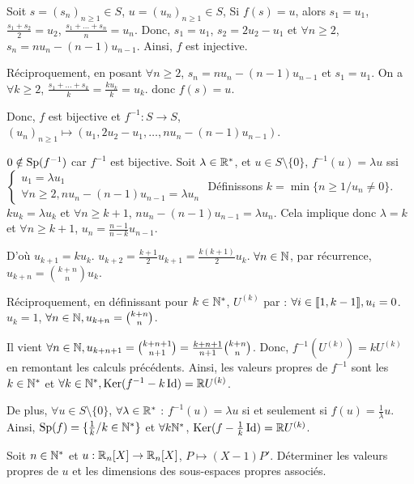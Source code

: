 \begin{solution}
Soit $s = (s_n)_{n \geq 1} \in S$, $u = (u_n)_{n \geq 1} \in S$,
Si $f(s) = u$, alors $s_1 = u_1$, $\frac{s_1+s_2}{2} = u_2$, $\frac{s_1+\dots+s_n}{n} = u_n$.
Donc, $s_1 = u_1$, $s_2 = 2u_2 - u_1$ et $\forall n \geq 2$, $s_n = n u_n - (n-1) u_{n-1}$.
Ainsi, $f$ est injective.

Réciproquement, en posant $\forall n \geq 2$, $s_n = n u_n - (n-1) u_{n-1}$ et $s_1 = u_1$.
On a $\forall k \geq 2$, $\frac{s_1 + \dots + s_k}{k} = \frac{k u_k}{k} = u_k$.
donc $f(s) = u$.

Donc, $f$ est bijective et $f^{-1} : S \to S$,
$(u_n)_{n \geq 1} \mapsto (u_1, 2u_2 - u_1, \dots, n u_n - (n-1) u_{n-1})$.

$0 \notin \operatorname{Sp}(f^{-1})$ car $f^{-1}$ est bijective.
Soit $\lambda \in \mathbb R^*$, et $u \in S \setminus \{0\}$,
$f^{-1}(u) = \lambda u$ ssi $\begin{cases} u_1 = \lambda u_1 \\ \forall n \geq 2, n u_n - (n-1) u_{n-1} = \lambda u_n \end{cases}$
Définissons $k = \min \{n \geq 1 / u_n \neq 0\}$.
$k u_k = \lambda u_k$ et $\forall n \geq k+1$, $n u_n - (n-1) u_{n-1} = \lambda u_n$.
Cela implique donc $\lambda = k$ et $\forall n \geq k+1$, $u_n = \frac{n-1}{n-k} u_{n-1}$.

D'où $u_{k+1} = k u_k$.
$u_{k+2} = \frac{k+1}{2} u_{k+1} = \frac{k(k+1)}{2} u_k$.
$\forall n \in \mathbb N$, par récurrence, $u_{k+n} = \binom{k+n}{n} u_k$.

Réciproquement, en définissant pour $k \in \mathbb N^*$,
$U^{(k)}$ par : $\forall i \in \llbracket 1,k-1\rrbracket, u_i = 0$.
$u_k = 1$, $\forall n \in \mathbb N, u_{k+n} = \binom{k+n}{n}$.

Il vient $\forall n \in \mathbb N, u_{k+n+1} = \binom{k+n+1}{n+1} = \frac{k+n+1}{n+1} \binom{k+n}{n}$.
Donc, $f^{-1}(U^{(k)}) = k U^{(k)}$ en remontant les calculs précédents.
Ainsi, les valeurs propres de $f^{-1}$ sont les $k \in \mathbb N^*$ et $\forall k \in \mathbb N^*, \operatorname{Ker}(f^{-1} - k \operatorname{Id}) = \mathbb R U^{(k)}$.

De plus, $\forall u \in S \setminus \{0\}$, $\forall \lambda \in \mathbb R^*$ : $f^{-1}(u) = \lambda u$
si et seulement si $f(u) = \frac{1}{\lambda} u$.
Ainsi, $\operatorname{Sp}(f) = \{\frac{1}{k} / k \in \mathbb N^*\}$
et $\forall k \mathbb N^*$, $\operatorname{Ker}(f - \frac{1}{k} \operatorname{Id}) = \mathbb R U^{(k)}$.
\end{solution}


\begin{statementbox}
Soit $n \in \mathbb N^*$ et $u : \mathbb R_n[X] \to \mathbb R_n[X]$, $P \mapsto (X-1)P'$.
Déterminer les valeurs propres de $u$ et les dimensions des sous-espaces propres associés.
\end{statementbox}

